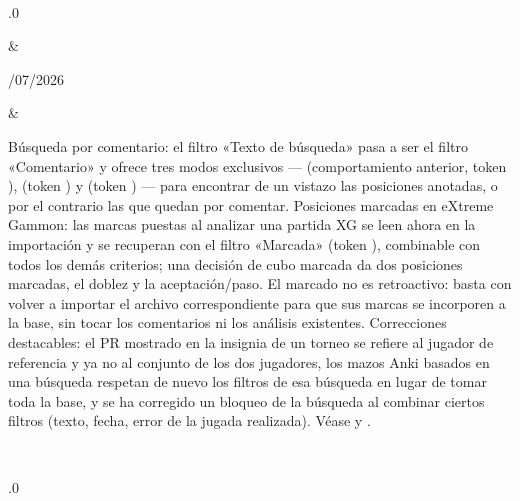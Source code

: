 \documentclass[letterpaper,10pt,spanish]{sphinxmanual}
\begin{document}
\begin{savenotes}
\begin{longtable}{}
\begin{varwidth}[t]{}
\sphinxbeforeendvarwidth
\end{varwidth}%
\\
\sphinxhline\begin{varwidth}[t]{}
.0
\sphinxbeforeendvarwidth
\end{varwidth}%
&\begin{varwidth}[t]{}
/07/2026
\sphinxbeforeendvarwidth
\end{varwidth}%
&\begin{varwidth}[t]{}
\sphinxAtStartPar
Búsqueda por comentario: el filtro «Texto de búsqueda» pasa a ser el filtro «Comentario» y ofrece tres modos exclusivos —  (comportamiento anterior, token ),  (token ) y  (token ) — para encontrar de un vistazo las posiciones anotadas, o por el contrario las que quedan por comentar. Posiciones marcadas en eXtreme Gammon: las marcas puestas al analizar una partida XG se leen ahora en la importación y se recuperan con el filtro «Marcada» (token ), combinable con todos los demás criterios; una decisión de cubo marcada da dos posiciones marcadas, el doblez y la aceptación/paso. El marcado no es retroactivo: basta con volver a importar el archivo  correspondiente para que sus marcas se incorporen a la base, sin tocar los comentarios ni los análisis existentes. Correcciones destacables: el PR mostrado en la insignia de un torneo se refiere al jugador de referencia y ya no al conjunto de los dos jugadores, los mazos Anki basados en una búsqueda respetan de nuevo los filtros de esa búsqueda en lugar de tomar toda la base, y se ha corregido un bloqueo de la búsqueda al combinar ciertos filtros (texto, fecha, error de la jugada realizada). Véase {\hyperref[\detokenize{cmd_mode:cmd-mode}]{}} y {\hyperref[\detokenize{manuel:manuel}]{}}.
\sphinxbeforeendvarwidth
\end{varwidth}%
\\
\sphinxhline\begin{varwidth}[t]{}
.0
\sphinxbeforeendvarwidth
\end{varwidth}%

\end{longtable}
\end{savenotes}
\end{document}
